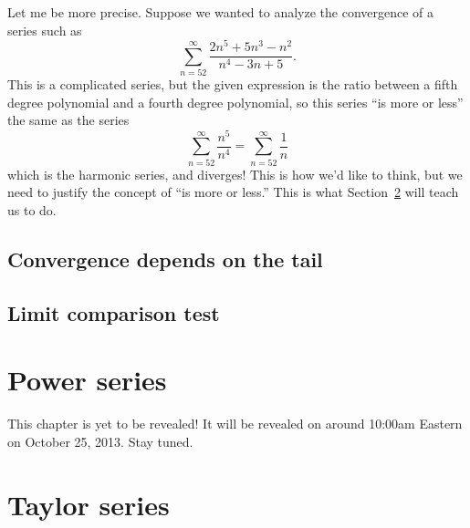 \documentclass[justified]{tufte-book}
\newcommand{\xrefn}[1]{\ref{#1}}
\begin{document}
Let me be more precise.  Suppose we wanted to analyze the convergence of a series such as
\[
\sum_{n=52}^\infty \frac{2n^5 + 5n^3 - n^2}{n^4 - 3n + 5}. 
\]
This is a complicated series, but the given expression is the ratio
between a fifth degree polynomial and a fourth degree polynomial, so this series ``is more or less'' the same as the series
\[
\sum_{n=52}^\infty \frac{n^5}{n^4} = \sum_{n=52}^\infty \frac{1}{n}
\]
which is the harmonic series, and diverges!  This is how we'd like to
think, but we need to justify the concept of ``is more or less.''
This is what Section~\xrefn{section:limit-comparison-test} will teach
us to do.

\section{Convergence depends on the tail}
\label{section:convergence-for-tails}


\section{Limit comparison test}
\label{section:limit-comparison-test}


\chapter{Power series}
\label{chapter:power-series}

This chapter is yet to be revealed!  It will be revealed on
around 10:00am Eastern on October 25, 2013.  Stay tuned.


%
%

\chapter{Taylor series}
\label{chapter:taylor-series}
\end{document}
